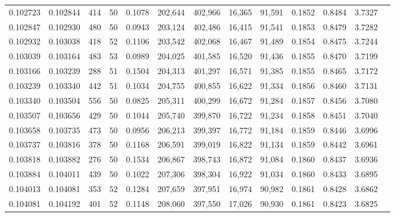 \begin{tabular}{rrrrrrrrrrrrr}
0.102723 & 0.102844 &   414 &  50 &                                     0.1078 & 202,644 & 402,966 &  16,365 &  91,591 & 0.1852 & 0.8484 & 3.7327 \\
0.102847 & 0.102930 &   480 &  50 &                                     0.0943 & 203,124 & 402,486 &  16,415 &  91,541 & 0.1853 & 0.8479 & 3.7282 \\
0.102932 & 0.103038 &   418 &  52 &                                     0.1106 & 203,542 & 402,068 &  16,467 &  91,489 & 0.1854 & 0.8475 & 3.7244 \\
0.103039 & 0.103164 &   483 &  53 &                                     0.0989 & 204,025 & 401,585 &  16,520 &  91,436 & 0.1855 & 0.8470 & 3.7199 \\
0.103166 & 0.103239 &   288 &  51 &                                     0.1504 & 204,313 & 401,297 &  16,571 &  91,385 & 0.1855 & 0.8465 & 3.7172 \\
0.103239 & 0.103340 &   442 &  51 &                                     0.1034 & 204,755 & 400,855 &  16,622 &  91,334 & 0.1856 & 0.8460 & 3.7131 \\
0.103340 & 0.103504 &   556 &  50 &                                     0.0825 & 205,311 & 400,299 &  16,672 &  91,284 & 0.1857 & 0.8456 & 3.7080 \\
0.103507 & 0.103656 &   429 &  50 &                                     0.1044 & 205,740 & 399,870 &  16,722 &  91,234 & 0.1858 & 0.8451 & 3.7040 \\
0.103658 & 0.103735 &   473 &  50 &                                     0.0956 & 206,213 & 399,397 &  16,772 &  91,184 & 0.1859 & 0.8446 & 3.6996 \\
0.103737 & 0.103816 &   378 &  50 &                                     0.1168 & 206,591 & 399,019 &  16,822 &  91,134 & 0.1859 & 0.8442 & 3.6961 \\
0.103818 & 0.103882 &   276 &  50 &                                     0.1534 & 206,867 & 398,743 &  16,872 &  91,084 & 0.1860 & 0.8437 & 3.6936 \\
0.103884 & 0.104011 &   439 &  50 &                                     0.1022 & 207,306 & 398,304 &  16,922 &  91,034 & 0.1860 & 0.8433 & 3.6895 \\
0.104013 & 0.104081 &   353 &  52 &                                     0.1284 & 207,659 & 397,951 &  16,974 &  90,982 & 0.1861 & 0.8428 & 3.6862 \\
0.104081 & 0.104192 &   401 &  52 &                                     0.1148 & 208,060 & 397,550 &  17,026 &  90,930 & 0.1861 & 0.8423 & 3.6825 \\

\end{tabular}
